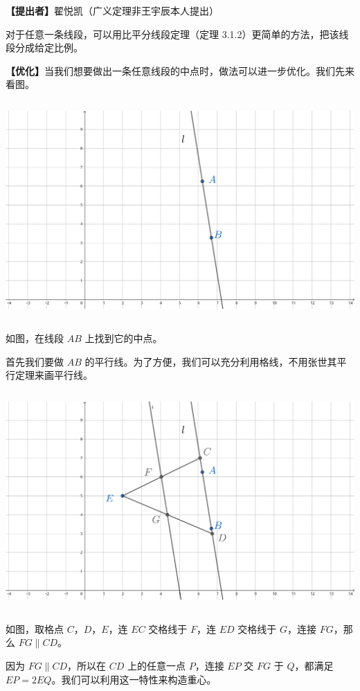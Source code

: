 \documentclass[UTF8]{article}
\begin{document}
\textbf{【提出者】}翟悦凯（广义定理非王宇辰本人提出）

对于任意一条线段，可以用比平分线段定理（定理
3.1.2）更简单的方法，把该线段分成给定比例。

\textbf{【优化】}当我们想要做出一条任意线段的中点时，做法可以进一步优化。我们先来看图。

\includegraphics[width=5.75833in,height=3.275in]{media/image27.png}

如图，在线段 \(AB\) 上找到它的中点。

首先我们要做 \(AB\)
的平行线。为了方便，我们可以充分利用格线，不用张世其平行定理来画平行线。

\includegraphics[width=5.75833in,height=3.275in]{media/image28.png}

如图，取格点 \(C\)，\(D\)，\(E\)，连 \(EC\) 交格线于 \(F\)，连 \(ED\)
交格线于 \(G\)，连接 \(FG\)，那么 \(FG \parallel CD\)。

因为 \(FG \parallel CD\)，所以在 \(CD\) 上的任意一点 \(P\)，连接 \(EP\)
交 \(FG\) 于 \(Q\)，都满足
\(EP = 2EQ\)。我们可以利用这一特性来构造重心。
\end{document}
